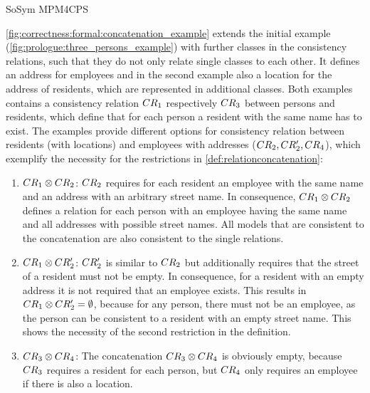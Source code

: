 \begin{copiedFrom}{SoSym MPM4CPS}
\begin{example}
\autoref{fig:correctness:formal:concatenation_example} extends the initial example (\autoref{fig:prologue:three_persons_example}) with further classes in the consistency relations, such that they do not only relate single classes to each other.
It defines an address for employees and in the second example also a location for the address of residents, which are represented in additional classes.
Both examples contains a consistency relation $CR_{1}$ respectively $CR_{3}$ between persons and residents, which define that for each person a resident with the same name has to exist.
The examples provide different options for consistency relation between residents (with locations) and employees with addresses ($CR_{2}, CR'_{2}, CR_{4}$), which exemplify the necessity for the restrictions in \autoref{def:relationconcatenation}:
\begin{enumerate}
    \item $CR_{1} \otimes CR_{2}$: 
$CR_{2}$ requires for each resident an employee with the same name and an address with an arbitrary street name.
In consequence, $CR_{1} \otimes CR_{2}$ defines a relation for each person with an employee having the same name and all addresses with possible street names.
All models that are consistent to the concatenation are also consistent to the single relations.
    \item $CR_{1} \otimes CR'_{2}$: 
$CR'_{2}$ is similar to $CR_{2}$ but additionally requires that the street of a resident must not be empty. 
In consequence, for a resident with an empty address it is not required that an employee exists.
This results in $CR_{1} \otimes CR'_{2} = \emptyset$, because for any person, there must not be an employee, as the person can be consistent to a resident with an empty street name.
This shows the necessity of the second restriction in the definition. 
    \item $CR_{3} \otimes CR_{4}$: 
The concatenation $CR_{3} \otimes CR_{4}$ is obviously empty, because $CR_{3}$ requires a resident for each person, but $CR_{4}$ only requires an employee if there is also a location.

\end{enumerate}
\end{example}
\end{copiedFrom}
